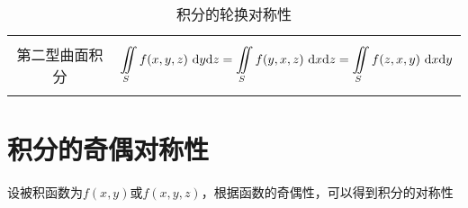 \begin{table}[!htb]
{\begin{tabular}{cc}
			& \vspace*{-1.5em} \\
			\hline
			& \vspace*{-1.1em} \\
			第二型曲面积分 &  $\displaystyle \iint\limits_{S}f(x,y,z)\,\,{\rm{d}} y {\rm{d}} z =\iint\limits_{S}f(y,x,z)\,\,{\rm{d}} x{\rm{d}} z = \iint\limits_{S}f(z,x,y)\,\,{\rm{d}} x{\rm{d}} y $ \\
			& \vspace*{-1.7em} \\
			\bottomrule[2pt]
		\end{tabular}  
	}
	\caption{积分的轮换对称性}
	\renewcommand{\arraystretch}{1}
	\label{积分的轮换对称性}
\end{table} 

\section{积分的奇偶对称性}
设被积函数为$f(x,y)$或$f(x,y,z)$，根据函数的奇偶性，可以得到积分的对称性
